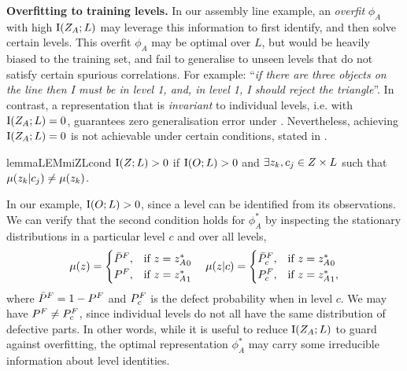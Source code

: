 \textbf{Overfitting to training levels.} In our assembly line example, an \textit{overfit} $\phi_A$ with high $\text{I}(Z_A;L)$ may leverage this information to first identify, and then solve certain levels. This overfit $\phi_A$ may be optimal over $L$, but would be heavily biased to the training set, and fail to generalise to unseen levels that do not satisfy certain spurious correlations. For example: ``\textit{if there are three objects on the line then I must be in level 1, and, in level 1, I should reject the triangle}''. In contrast, a representation that is \textit{invariant} to individual levels, i.e. with $\text{I}(Z_A;L)=0$, guarantees zero generalisation error under . Nevertheless, achieving $\text{I}(Z_A;L)=0$ is not achievable under certain conditions, stated in .
\begin{restatable}{lemma}{LEMmiZLcond}\label{c2:lem:miZL_cond}
    $\text{I}(Z;L) > 0$ if $\text{I}(O;L) > 0$ and $\exists z_k,c_j \in Z\times L$ such that $\mu(z_k|c_j) \neq \mu(z_k)$.
\end{restatable} In our example, $\text{I}(O;L) > 0$, since a level can be identified from its observations. We can verify that the second condition holds for $\phi^*_A$ by inspecting the stationary distributions in a particular level $c$ and over all levels,
\begin{equation}
    \mu(z) = \begin{cases}
      {\bar{P}}^F, & \text{if}\ z={z^*_A}_0 \\
      {P}^F, & \text{if}\  z={z^*_A}_1
    \end{cases}
\quad
    \mu(z|c) = \begin{cases}
      {\bar{P}}^F_c, & \text{if}\ z={z^*_A}_0 \\
      {P}^F_c, & \text{if}\  z={z^*_A}_1,
    \end{cases}
\end{equation}
where ${\bar{P}}^F=1-{P}^F$ and ${P}^F_c$ is the defect probability when in level $c$. We may have ${P}^F \neq {P}^F_c$, since individual levels do not all have the same distribution of defective parts. In other words, while it is useful to reduce $\text{I}(Z_A;L)$ to guard against overfitting, the optimal representation $\phi^*_A$ may carry some irreducible information about level identities.  %

